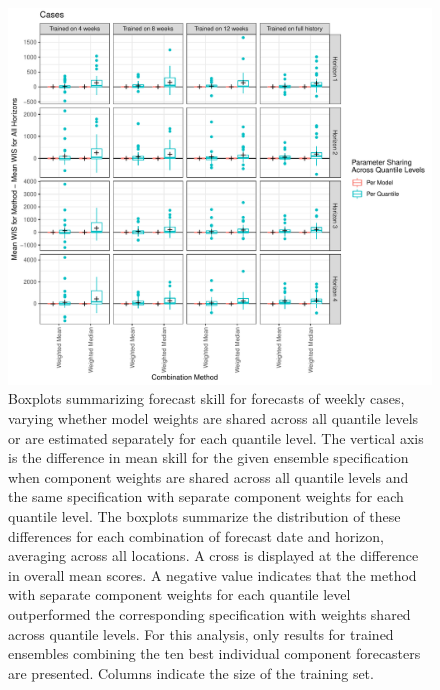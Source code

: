 \documentclass[review]{elsarticle}
\begin{document}
\begin{figure}
  \includegraphics[width=\textwidth]{figures/wis_boxplots_quantile_grouping_Cases.pdf}
  \caption{Boxplots summarizing forecast skill for forecasts of weekly cases, varying whether model weights are shared across all quantile levels or are estimated separately for each quantile level.
  The vertical axis is the difference in mean skill for the given ensemble specification when component weights are shared across all quantile levels and the same specification with separate component weights for each quantile level.
  The boxplots summarize the distribution of these differences for each combination of forecast date and horizon, averaging across all locations.
  A cross is displayed at the difference in overall mean scores.
  A negative value indicates that the method with separate component weights for each quantile level outperformed the corresponding specification with weights shared across quantile levels.
  For this analysis, only results for trained ensembles combining the ten best individual component forecasters are presented.
  Columns indicate the size of the training set.}
\end{figure}
\end{document}
